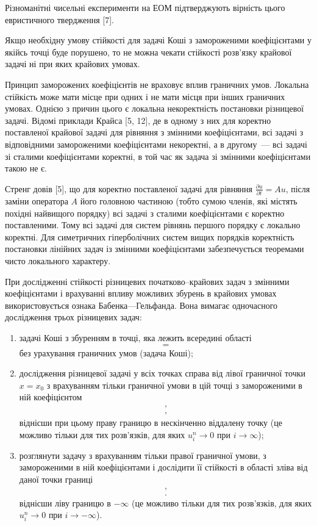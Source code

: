 Різноманітні чисельні експерименти на ЕОМ підтверджують вірність цього евристичного твердження [7]. \medskip

Якщо необхідну умову стійкості для задачі Коші з замороженими коефіцієнтами у якійсь точці буде порушено, то не можна чекати стійкості розв'язку крайової задачі ні при яких крайових умовах. \medskip

Принцип заморожених коефіцієнтів не враховує вплив граничних умов. Локальна стійкість може мати місце при одних і не мати місця при інших граничних умовах. Однією з причин цього є локальна некоректність постановки різницевої задачі. Відомі приклади Крайса [5, 12], де в одному з них для коректно поставленої крайової задачі для рівняння з змінними коефіцієнтами, всі задачі з відповідними замороженими коефіцієнтами некоректні, а в другому~--- всі задачі зі сталими коефіцієнтами коректні, в той час як задача зі змінними коефіцієнтами такою не є. \medskip

Стренг довів [5], що для коректно поставленої задачі для рівняння $\frac{\partial u}{\partial t} = A u$, після заміни оператора $A$ його головною частиною (тобто сумою членів, які містять похідні найвищого порядку) всі задачі з сталими коефіцієнтами є коректно поставленими. Тому всі задачі для систем рівнянь першого порядку є локально коректні. Для симетричних гіперболічних систем вищих порядків коректність постановки лінійних задач із змінними коефіцієнтами забезпечується теоремами чисто локального характеру. \medskip

При дослідженні стійкості різницевих початково–крайових задач з змінними коефіцієнтами і врахуванні впливу можливих збурень в крайових умовах використовується ознака Бабенка---Гельфанда. Вона вимагає одночасного дослідження трьох різницевих задач: 
\begin{enumerate}
    \item задачі Коші з збуренням в точці, яка лежить всередині області
    \begin{equation*}
        =
    \end{equation*}
    без урахування граничних умов (задача Коші); 

	\item дослідження різницевої задачі у всіх точках справа від лівої граничної точки $x = x_0$ з врахуванням тільки граничної умови в цій точці з замороженими в ній коефіцієнтом
    \begin{gather*}
        , \\
        ,
    \end{gather*}
    віднісши при цьому праву границю в нескінченно віддалену точку (це можливо тільки для тих розв'язків, для яких $u_i^n \to 0$ при $i \to \infty$);

	\item  розглянути задачу з врахуванням тільки правої граничної умови, з замороженими в ній коефіцієнтами і дослідити її стійкості в області зліва від даної точки границі
    \begin{gather*}
        , \\
        .
    \end{gather*}
    віднісши ліву границю в $-\infty$ (це можливо тільки для тих розв'язків, для яких $u_i^n \to 0$ при $i \to -\infty$).
\end{enumerate}

